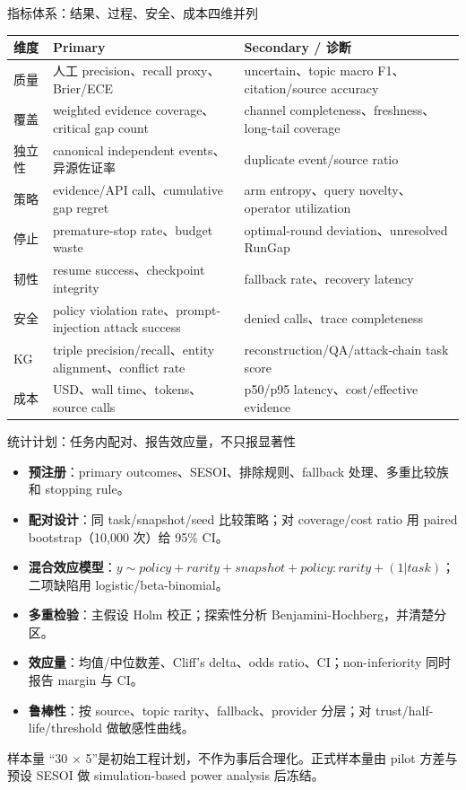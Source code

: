 \begin{frame}{指标体系：结果、过程、安全、成本四维并列}
\scriptsize
\begin{tabularx}{\textwidth}{p{} X X}
\toprule
维度 & Primary & Secondary / 诊断 \\
\midrule
质量 & 人工 precision、recall proxy、Brier/ECE & uncertain、topic macro F1、citation/source accuracy \\
覆盖 & weighted evidence coverage、critical gap count & channel completeness、freshness、long-tail coverage \\
独立性 & canonical independent events、异源佐证率 & duplicate event/source ratio \\
策略 & evidence/API call、cumulative gap regret & arm entropy、query novelty、operator utilization \\
停止 & premature-stop rate、budget waste & optimal-round deviation、unresolved RunGap \\
韧性 & resume success、checkpoint integrity & fallback rate、recovery latency \\
安全 & policy violation rate、prompt-injection attack success & denied calls、trace completeness \\
KG & triple precision/recall、entity alignment、conflict rate & reconstruction/QA/attack-chain task score \\
成本 & USD、wall time、tokens、source calls & p50/p95 latency、cost/effective evidence \\
\bottomrule
\end{tabularx}
\end{frame}

\begin{frame}{统计计划：任务内配对、报告效应量，不只报显著性}
\small
\begin{itemize}
  \item \textbf{预注册}：primary outcomes、SESOI、排除规则、fallback 处理、多重比较族和 stopping rule。
  \item \textbf{配对设计}：同 task/snapshot/seed 比较策略；对 coverage/cost ratio 用 paired bootstrap（10,000 次）给 95\% CI。
  \item \textbf{混合效应模型}：$y\sim policy+rarity+snapshot+policy\!:\!rarity+(1|task)$；二项缺陷用 logistic/beta-binomial。
  \item \textbf{多重检验}：主假设 Holm 校正；探索性分析 Benjamini-Hochberg，并清楚分区。
  \item \textbf{效应量}：均值/中位数差、Cliff's delta、odds ratio、CI；non-inferiority 同时报告 margin 与 CI。
  \item \textbf{鲁棒性}：按 source、topic rarity、fallback、provider 分层；对 trust/half-life/threshold 做敏感性曲线。
\end{itemize}

\begin{alertblock}{样本量}
“30 × 5”是初始工程计划，不作为事后合理化。正式样本量由 pilot 方差与预设 SESOI 做 simulation-based power analysis 后冻结。
\end{alertblock}
\end{frame}

